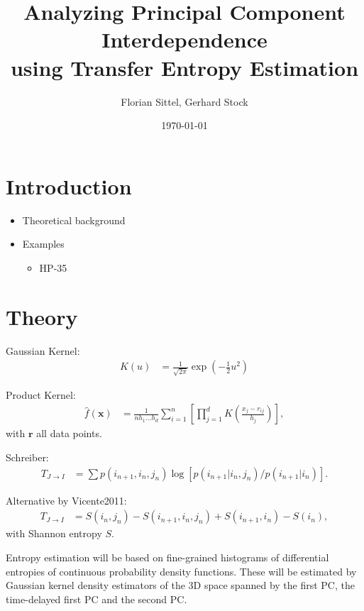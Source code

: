 \documentclass[12pt,a4paper,twoside,english,fleqn,preprint,aps,prb]{revtex4}
\newcommand{\rr}{\mathbf{r}}
\newcommand{\xx}{\mathbf{x}}
\begin{document}
\author{Florian Sittel, Gerhard Stock} 
\title{Analyzing Principal Component Interdependence\\ using Transfer Entropy Estimation}
\date{\today}

\begingroup
 \let\clearpage\relax
 \maketitle
\endgroup

\tableofcontents
\clearpage


\section{Introduction}
\begin{itemize}
  \item Theoretical background
  \item Examples
        \begin{itemize}
          \item HP-35
        \end{itemize}
\end{itemize}


\section{Theory}

Gaussian Kernel:
\begin{align}
  K(u) &= \frac{1}{\sqrt{2\pi}} \exp(-\frac{1}{2} u^2)
\end{align}

Product Kernel:
\begin{align}
  \hat{f}(\xx) &= \frac{1}{n h_1 \dots h_d} \sum_{i=1}^{n}\left[ \prod_{j=1}^{d} K\left(\frac{x_j - r_{ij}}{h_j} \right)\right],
\end{align}
with $\rr$ all data points.

Schreiber:
\begin{align}
  T_{J \rightarrow I} &= \sum p(i_{n+1}, i_n, j_n) \log \left[p(i_{n+1} \vert i_n, j_n) / p(i_{n+1} \vert i_n) \right].
\end{align}

Alternative by Vicente2011:
\begin{align}
  T_{J \rightarrow I} &= S(i_n, j_n) - S(i_{n+1}, i_n, j_n) + S(i_{n+1}, i_n) - S(i_n),
\end{align}
with Shannon entropy $S$.


Entropy estimation will be based on fine-grained histograms of differential entropies of continuous probability density functions.
These will be estimated by Gaussian kernel density estimators of the 3D space spanned by the first PC, the time-delayed first PC
and the second PC.




\end{document}
